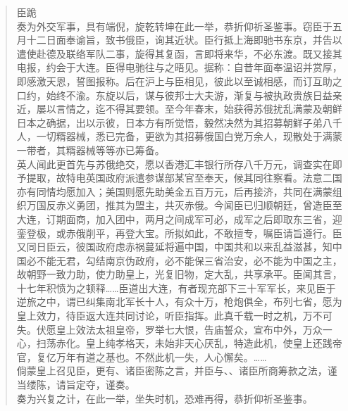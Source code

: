 \begin{quote}
	臣跪\\

奏为外交军事，具有端倪，旋乾转坤在此一举，恭折仰祈圣鉴事。窃臣于五月十二日面奉谕旨，致书俄臣，询其近状。臣行抵上海即驰书东京，并告以遣使赴德及联络军队二事，旋得其复函，言即将来华，不必东渡。既又接其电报，约会于大连。臣得电驰往与之晤见。据称：自昔年面奉温诏并赏厚，即感激天恩，誓图报称。后在沪上与臣相见，彼此以至诚相感，而订互助之口约，始终不渝。东旋以后，谋与彼邦士大夫游，渐复与被执政贵族日益亲近，屡以言情之，迄不得其要领。至今年春末，始获得苏俄扰乱满蒙及朝鲜日本之确据，出以示彼，日本方有所觉悟，毅然决然为其招募朝鲜子弟八千人，一切糈器械，悉已完备，更欲为其招募俄国白党万余人，现散处于满蒙一带者，其糈器械等等亦已筹备。\\

英人闻此更首先与苏俄绝交，愿以香港汇丰银行所存八千万元，调查实在即予提取，故特电英国政府派遣参谋部某官至奉天，候其同往察看。法意二国亦有同情均愿加入；美国则愿先助美金五百万元，后再接济，共同在满蒙组织万国反赤义勇团，推其为盟主，共灭赤俄。今闻臣已归顺朝廷，曾造臣至大连，订期面商，加入团中，两月之间成军可必，成军之后即取东三省，迎銮登极，或赤俄削平，再登大宝。所拟如此，不敢擅专，嘱臣请旨遵行。臣又同日臣云，彼国政府虑赤祸蔓延将遍中国，中国共和以来乱益滋甚，知中国必不能无君，勾结南京伪政府，必不能保三省治安，必不能为中国之主，故朝野一致力助，使力助皇上，光复旧物，定大乱，共享承平。臣闻其言，十七年积愤为之顿释……臣道出大连，有者现充部下三十军军长，来见臣于逆旅之中，谓已纠集南北军长十人，有众十万，枪炮俱全，布列七省，愿为皇上效力，待臣返大连共同讨论，听臣指挥。此真千载一时之机，万不可失。伏愿皇上效法太祖皇帝，罗举七大恨，告庙誓众，宣布中外，万众一心，扫荡赤化。皇上纯孝格天，未始非天心厌乱，特造此机，使皇上还践帝官，复亿万年有道之基也。不然此机一失，人心懈矣。……\\

倘蒙皇上召见臣，更有、诸臣密陈之言，并臣与、、诸臣所商筹款之法，谨当缕陈，请旨定夺，谨奏。\\

奏为兴复之计，在此一举，坐失时机，恐难再得，恭折仰祈圣鉴事。\\


\end{quote}
